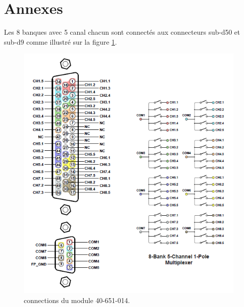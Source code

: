 \chapter*{Annexes}

Les 8 banques avec 5 canal chacun sont connectés aux connecteurs sub-d50 et sub-d9 comme illustré sur la figure \ref{fig:Annexe-cablage-40-651-014}. 

\begin{figure}[H]
    \centering
    \includegraphics[width=1.00\textwidth]{images/Annexe-cablage-40-651-014}
    \caption{connections du module 40-651-014.}
    \label{fig:Annexe-cablage-40-651-014}
\end{figure}